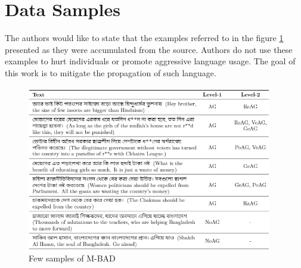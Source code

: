 \documentclass[11pt]{article}
\begin{document}
\section{Data Samples}
\label{sample}
The authors would like to state that the examples referred to in the figure \ref{examp} presented as they were accumulated from the source. Authors do not use these examples to hurt individuals or promote aggressive language usage. The goal of this work is to mitigate the propagation of such language.
\begin{figure}[t!]
\centering
\includegraphics[width =0.95\textwidth]{Figure/example.PNG}
\caption{Few samples of M-BAD}
\label{examp}
\end{figure}
\end{document}
